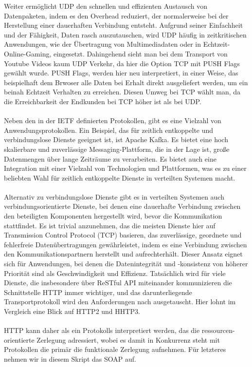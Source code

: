 Weiter ermöglicht UDP  den schnellen und effizienten Austausch von Datenpaketen, indem es den Overhead reduziert, der normalerweise bei der Herstellung einer dauerhaften Verbindung entsteht. Aufgrund seiner Einfachheit und der Fähigkeit, Daten rasch auszutauschen, wird UDP häufig in zeitkritischen Anwendungen, wie der Übertragung von Multimediadaten oder in Echtzeit-Online-Gaming, eingesetzt. Dahingehend sieht man bei dem Transport von Youtube Videos kaum UDP Verkehr, da hier die Option TCP mit PUSH Flags gewählt wurde. PUSH Flags, werden hier neu interpretiert, in einer Weise, das beispielhaft dem Brwoser alle Daten bei Erhalt direkt ausgeliefert werden, um ein beinah Echtzeit Verhalten zu erreichen. Diesen Umweg bei TCP wählt man, da die Erreichbarkeit der Endkunden bei TCP höher ist als bei UDP.
\\\\
Neben den in der IETF definierten Protokollen, gibt es eine Vielzahl von Anwendungsprotokollen. Ein Beispiel, das für zeitlich entkoppelte und verbindungslose Dienste geeignet ist, ist Apache Kafka. Es bietet eine hoch skalierbare und zuverlässige Messaging-Plattform, die in der Lage ist, große Datenmengen über lange Zeiträume zu verarbeiten. Es bietet auch eine Integration mit einer Vielzahl von Technologien und Plattformen, was es zu einer beliebten Wahl für zeitlich entkoppelte Dienste in verteilten Systemen macht.
\\\\
Alternativ zu verbindungslose Dienste gibt es in verteilten Systemen auch verbindungsorientierte Dienste, bei denen eine dauerhafte Verbindung zwischen den beteiligten Komponenten hergestellt wird, bevor die Kommunikation stattfindet. Es ist trivial anzunehmen, das die meisten Dienste hier auf Transmission Control Protocol (TCP) basieren, das zuverlässige, geordnete und fehlerfreie Datenübertragungen gewährleistet, indem es eine Verbindung zwischen den Kommunikationspartnern herstellt und aufrechterhält. Dieser Ansatz eignet sich für Anwendungen, bei denen die Datenintegrität und -konsistenz von höherer Priorität sind als Geschwindigkeit und Effizienz. Tatsächlich wird für viele Dienste, die insbesondere über ReSTful API miteinander kommunizieren die Schnittstelle HTTP immer wichtiger, und das darunterliegende Transportprotokoll wird den Anforderungen nach ausgetauscht. Hier lohnt im Vergleich eine Blick auf HTTP2 und HHTP3.
\\\\
HTTP kann daher als ein Protokolls interpretiert werden, das die ressourcen-orientierte Zerlegung adressiert, wobei es damit in Konkurrenz steht mit Protokollen die primär die funktionale Zerlegung aufnehmen. Für letzteres nehmen wir in diesem Skript das SOAP auf. 
